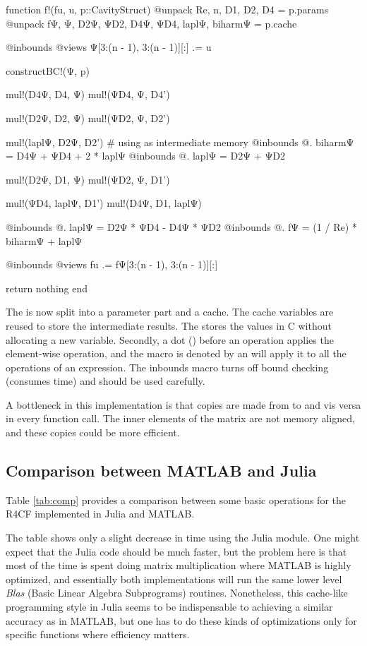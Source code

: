 \begin{jllisting}[caption=Optimized implementation in Julia of the nonlinear function $F$]
function f!(fu, u, p::CavityStruct)
    @unpack Re, n, D1, D2, D4 = p.params
    @unpack fΨ, Ψ, D2Ψ, ΨD2, D4Ψ, ΨD4, laplΨ, biharmΨ = p.cache

    @inbounds @views Ψ[3:(n - 1), 3:(n - 1)][:] .= u

    constructBC!(Ψ, p)

    mul!(D4Ψ, D4, Ψ)
    mul!(ΨD4, Ψ, D4')

    mul!(D2Ψ, D2, Ψ)
    mul!(ΨD2, Ψ, D2')

    mul!(laplΨ, D2Ψ, D2') # using as intermediate memory
    @inbounds @. biharmΨ = D4Ψ + ΨD4 + 2 * laplΨ
    @inbounds @. laplΨ = D2Ψ + ΨD2

    mul!(D2Ψ, D1, Ψ)
    mul!(ΨD2, Ψ, D1')

    mul!(ΨD4, laplΨ, D1')
    mul!(D4Ψ, D1, laplΨ)

    @inbounds @. laplΨ = D2Ψ * ΨD4 - D4Ψ * ΨD2
    @inbounds @. fΨ = (1 / Re) * biharmΨ + laplΨ

    @inbounds @views fu .= fΨ[3:(n - 1), 3:(n - 1)][:]

    return nothing
end
\end{jllisting}

The  is now split into a parameter part and a cache.
The cache variables are reused to store the intermediate results. The
 stores the values in C without allocating a new variable.
Secondly, a dot () before an operation applies the element-wise
operation, and the macro is denoted by an  will apply it to all the
operations of an expression. The  inbounds macro turns off bound
checking (consumes time) and should be used carefully.

A bottleneck in this implementation is that copies are made from  to
 and vis versa in every function call. The inner elements of the
matrix  are not memory aligned, and these copies could be more
efficient.

\subsection{Comparison between MATLAB and Julia}

Table \ref{tab:comp} provides a comparison between some basic operations for the
R4CF implemented in Julia and MATLAB. 

The table shows only a slight decrease in time using the Julia module. One
might expect that the Julia code should be much faster, but the problem here is
that most of the time is spent doing matrix multiplication where MATLAB is
highly optimized, and essentially both implementations will run the same lower
level \emph{Blas} (Basic Linear Algebra Subprograms) routines. Nonetheless,
this cache-like programming style in Julia seems to be indispensable to
achieving a similar accuracy as in MATLAB, but one has to do these kinds of
optimizations only for specific functions where efficiency matters.

